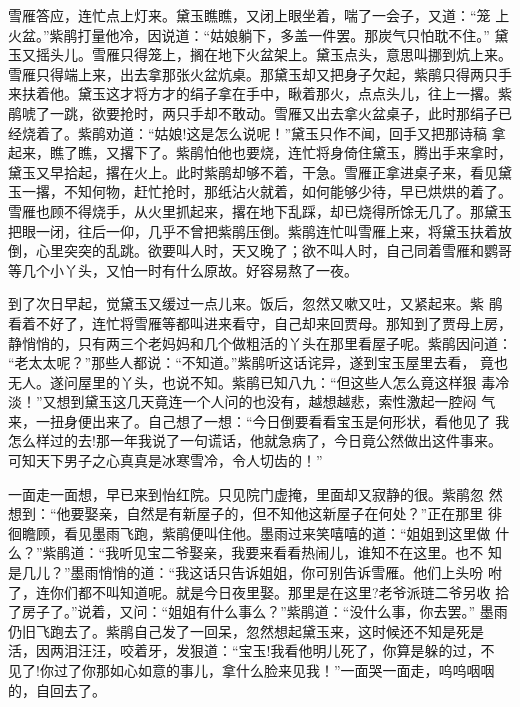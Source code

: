 雪雁答应，连忙点上灯来。黛玉瞧瞧，又闭上眼坐着，喘了一会子，又道：“笼
上火盆。”紫鹃打量他冷，因说道：“姑娘躺下，多盖一件罢。那炭气只怕耽不住。”
黛玉又摇头儿。雪雁只得笼上，搁在地下火盆架上。黛玉点头，意思叫挪到炕上来。
雪雁只得端上来，出去拿那张火盆炕桌。那黛玉却又把身子欠起，紫鹃只得两只手
来扶着他。黛玉这才将方才的绢子拿在手中，瞅着那火，点点头儿，往上一撂。紫
鹃唬了一跳，欲要抢时，两只手却不敢动。雪雁又出去拿火盆桌子，此时那绢子已
经烧着了。紫鹃劝道：“姑娘!这是怎么说呢！”黛玉只作不闻，回手又把那诗稿
拿起来，瞧了瞧，又撂下了。紫鹃怕他也要烧，连忙将身倚住黛玉，腾出手来拿时，
黛玉又早拾起，撂在火上。此时紫鹃却够不着，干急。雪雁正拿进桌子来，看见黛
玉一撂，不知何物，赶忙抢时，那纸沾火就着，如何能够少待，早已烘烘的着了。
雪雁也顾不得烧手，从火里抓起来，撂在地下乱踩，却已烧得所馀无几了。那黛玉
把眼一闭，往后一仰，几乎不曾把紫鹃压倒。紫鹃连忙叫雪雁上来，将黛玉扶着放
倒，心里突突的乱跳。欲要叫人时，天又晚了；欲不叫人时，自己同着雪雁和鹦哥
等几个小丫头，又怕一时有什么原故。好容易熬了一夜。

到了次日早起，觉黛玉又缓过一点儿来。饭后，忽然又嗽又吐，又紧起来。紫
鹃看着不好了，连忙将雪雁等都叫进来看守，自己却来回贾母。那知到了贾母上房，
静悄悄的，只有两三个老妈妈和几个做粗活的丫头在那里看屋子呢。紫鹃因问道：
“老太太呢？”那些人都说：“不知道。”紫鹃听这话诧异，遂到宝玉屋里去看，
竟也无人。遂问屋里的丫头，也说不知。紫鹃已知八九：“但这些人怎么竟这样狠
毒冷淡！”又想到黛玉这几天竟连一个人问的也没有，越想越悲，索性激起一腔闷
气来，一扭身便出来了。自己想了一想：“今日倒要看看宝玉是何形状，看他见了
我怎么样过的去!那一年我说了一句谎话，他就急病了，今日竟公然做出这件事来。
可知天下男子之心真真是冰寒雪冷，令人切齿的！”

一面走一面想，早已来到怡红院。只见院门虚掩，里面却又寂静的很。紫鹃忽
然想到：“他要娶亲，自然是有新屋子的，但不知他这新屋子在何处？”正在那里
徘徊瞻顾，看见墨雨飞跑，紫鹃便叫住他。墨雨过来笑嘻嘻的道：“姐姐到这里做
什么？”紫鹃道：“我听见宝二爷娶亲，我要来看看热闹儿，谁知不在这里。也不
知是几儿？”墨雨悄悄的道：“我这话只告诉姐姐，你可别告诉雪雁。他们上头吩
咐了，连你们都不叫知道呢。就是今日夜里娶。那里是在这里?老爷派琏二爷另收
拾了房子了。”说着，又问：“姐姐有什么事么？”紫鹃道：“没什么事，你去罢。”
墨雨仍旧飞跑去了。紫鹃自己发了一回呆，忽然想起黛玉来，这时候还不知是死是
活，因两泪汪汪，咬着牙，发狠道：“宝玉!我看他明儿死了，你算是躲的过，不
见了!你过了你那如心如意的事儿，拿什么脸来见我！”一面哭一面走，呜呜咽咽
的，自回去了。

